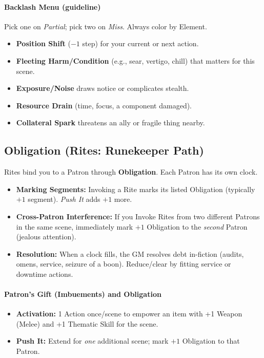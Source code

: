 \paragraph{Backlash Menu (guideline)}
Pick one on \emph{Partial}; pick two on \emph{Miss}. Always color by Element.
\begin{itemize}
  \item \textbf{Position Shift} ($-1$ step) for your current or next action.
  \item \textbf{Fleeting Harm/Condition} (e.g., sear, vertigo, chill) that matters for this scene.
  \item \textbf{Exposure/Noise} draws notice or complicates stealth.
  \item \textbf{Resource Drain} (time, focus, a component damaged).
  \item \textbf{Collateral Spark} threatens an ally or fragile thing nearby.
\end{itemize}

\subsection{Obligation (Rites: Runekeeper Path)}
Rites bind you to a Patron through \textbf{Obligation}. Each Patron has its own clock.
\begin{itemize}
  \item \textbf{Marking Segments:} Invoking a Rite marks its listed Obligation (typically $+1$ segment). \emph{Push It} adds $+1$ more.
  \item \textbf{Cross-Patron Interference:} If you Invoke Rites from two different Patrons in the same scene, immediately mark $+1$ Obligation to the \emph{second} Patron (jealous attention).
  \item \textbf{Resolution:} When a clock fills, the GM resolves debt in-fiction (audits, omens, service, seizure of a boon). Reduce/clear by fitting service or downtime actions.
\end{itemize}

\paragraph{Patron’s Gift (Imbuements) and Obligation}
\begin{itemize}
  \item \textbf{Activation:} 1 Action once/scene to empower an item with +1 Weapon (Melee) and +1 Thematic Skill for the scene.
  \item \textbf{Push It:} Extend for \emph{one} additional scene; mark $+1$ Obligation to that Patron.
\end{itemize}

